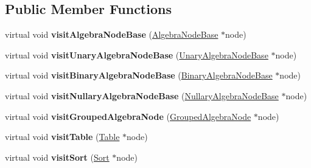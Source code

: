 \subsection*{Public Member Functions}
\begin{DoxyCompactItemize}
\item 
\hypertarget{class_algebra_visitor_a97257e8a65f77f30540b1223d92127fb}{virtual void {\bfseries visit\+Algebra\+Node\+Base} (\hyperlink{class_algebra_node_base}{Algebra\+Node\+Base} $\ast$node)}\label{class_algebra_visitor_a97257e8a65f77f30540b1223d92127fb}

\item 
\hypertarget{class_algebra_visitor_a371a822b60caab82b78c5750eff67b4b}{virtual void {\bfseries visit\+Unary\+Algebra\+Node\+Base} (\hyperlink{class_unary_algebra_node_base}{Unary\+Algebra\+Node\+Base} $\ast$node)}\label{class_algebra_visitor_a371a822b60caab82b78c5750eff67b4b}

\item 
\hypertarget{class_algebra_visitor_a00b2a6a2fb076160c0a8f713dd48d6d1}{virtual void {\bfseries visit\+Binary\+Algebra\+Node\+Base} (\hyperlink{class_binary_algebra_node_base}{Binary\+Algebra\+Node\+Base} $\ast$node)}\label{class_algebra_visitor_a00b2a6a2fb076160c0a8f713dd48d6d1}

\item 
\hypertarget{class_algebra_visitor_a5b5642743b1985cc5fd1e12002972388}{virtual void {\bfseries visit\+Nullary\+Algebra\+Node\+Base} (\hyperlink{class_nullary_algebra_node_base}{Nullary\+Algebra\+Node\+Base} $\ast$node)}\label{class_algebra_visitor_a5b5642743b1985cc5fd1e12002972388}

\item 
\hypertarget{class_algebra_visitor_a21ccc9b452a5c842d91cab7ec0855cfe}{virtual void {\bfseries visit\+Grouped\+Algebra\+Node} (\hyperlink{class_grouped_algebra_node}{Grouped\+Algebra\+Node} $\ast$node)}\label{class_algebra_visitor_a21ccc9b452a5c842d91cab7ec0855cfe}

\item 
\hypertarget{class_algebra_visitor_ac14f3c3c195373e3bae5d01d04f1ea09}{virtual void {\bfseries visit\+Table} (\hyperlink{class_table}{Table} $\ast$node)}\label{class_algebra_visitor_ac14f3c3c195373e3bae5d01d04f1ea09}

\item 
\hypertarget{class_algebra_visitor_ac350bf44664ce021c0cfec18258a14e8}{virtual void {\bfseries visit\+Sort} (\hyperlink{class_sort}{Sort} $\ast$node)}\label{class_algebra_visitor_ac350bf44664ce021c0cfec18258a14e8}


\end{DoxyCompactItemize}
